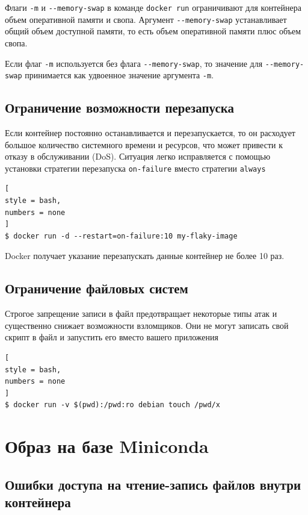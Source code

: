 \documentclass[%
	11pt,
	a4paper,
	utf8,
		]{article}
\begin{document}
Флаги \verb|-m| и \verb|--memory-swap| в команде \verb|docker run| ограничивают для контейнера объем оперативной памяти и свопа. Аргумент \verb|--memory-swap| устанавливает общий объем доступной памяти, то есть объем оперативной памяти плюс объем свопа.

Если флаг \verb|-m| используется без флага \verb|--memory-swap|, то значение для \verb|--memory-swap| принимается как удвоенное значение аргумента \verb|-m|.

\subsection{Ограничение возможности перезапуска}

Если контейнер постоянно останавливается и перезапускается, то он расходует большое количество системного времени и ресурсов, что может привести к отказу в обслуживании (DoS). Ситуация легко исправляется с помощью установки стратегии перезапуска \verb|on-failure| вместо стратегии \verb|always|
\begin{lstlisting}[
style = bash,
numbers = none
]
$ docker run -d --restart=on-failure:10 my-flaky-image
\end{lstlisting}

Docker получает указание перезапускать данные контейнер не более 10 раз.

\subsection{Ограничение файловых систем}

Строгое запрещение записи в файл предотвращает некоторые типы атак и существенно снижает возможности взломщиков. Они не могут записать свой скрипт в файл и запустить его вместо вашего приложения
\begin{lstlisting}[
style = bash,
numbers = none
]
$ docker run -v $(pwd):/pwd:ro debian touch /pwd/x
\end{lstlisting}



\section{Образ на базе Miniconda}

\subsection{Ошибки доступа на чтение-запись файлов внутри контейнера}
\end{document}

